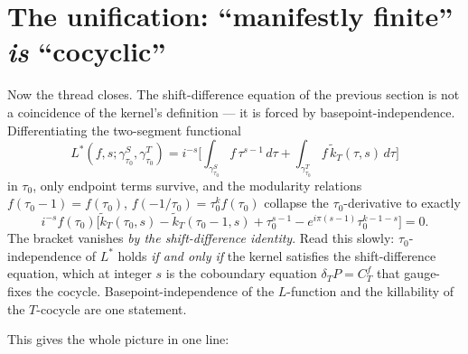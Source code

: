 \documentclass[11pt]{article}
\newcommand{\ktil}{\widetilde{k}_T}
\theoremstyle{plain}
\begin{document}
\section{The unification: ``manifestly finite'' \emph{is} ``cocyclic''}

Now the thread closes. The shift-difference equation of the previous
section is not a coincidence of the kernel's definition --- it is forced by
basepoint-independence. Differentiating the two-segment functional
\[
  L^*(f,s;\gamma^S_{\tau_0},\gamma^T_{\tau_0})
  = i^{-s}\!\Big[\textstyle\int_{\gamma^S_{\tau_0}} f\,\tau^{s-1}\,d\tau
  +\int_{\gamma^T_{\tau_0}} f\,\ktil(\tau,s)\,d\tau\Big]
\]
in $\tau_0$, only endpoint terms survive, and the modularity relations
$f(\tau_0-1)=f(\tau_0)$, $f(-1/\tau_0)=\tau_0^k f(\tau_0)$ collapse the
$\tau_0$-derivative to exactly
\[
  i^{-s}f(\tau_0)\big[\ktil(\tau_0,s)-\ktil(\tau_0-1,s)+\tau_0^{s-1}
  -e^{i\pi(s-1)}\tau_0^{k-1-s}\big]=0 .
\]
The bracket vanishes \emph{by the shift-difference identity}. Read this
slowly: $\tau_0$-independence of $L^*$ holds \emph{if and only if} the
kernel satisfies the shift-difference equation, which at integer $s$ is the
coboundary equation $\delta_T P=C^f_T$ that gauge-fixes the cocycle.
Basepoint-independence of the $L$-function and the killability of the
$T$-cocycle are one statement.

This gives the whole picture in one line:

\begin{center}
\end{center}
\end{document}
